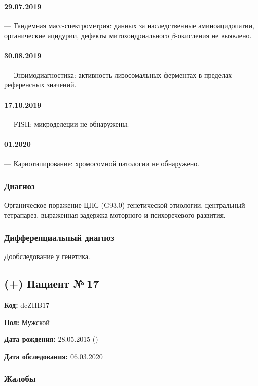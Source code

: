 \documentclass[a4paper,14pt]{extarticle}
\begin{document}
\paragraph{29.07.2019} --- Тандемная масс-спектрометрия: данных за наследственные аминоацидопатии, органические ацидурии, дефекты митохондриального $\beta$-окисления не выявлено.

\paragraph{30.08.2019} --- Энзимодиагностика: активность лизосомальных ферментах в пределах референсных значений.

\paragraph{17.10.2019} --- FISH: микроделеции не обнаружены.

\paragraph{01.2020} --- Кариотипирование: хромосомной патологии не обнаружено.

\subsubsection*{Диагноз}

Органическое поражение ЦНС (G93.0) генетической этиологии, центральный тетрапарез, выраженная задержка моторного и психоречевого развития.

\subsubsection*{Дифференциальный диагноз}

Дообследование у генетика.

\newpage
\subsection*{(+) Пациент №\,17}

\textbf{Код:} dcZHB17 

\textbf{Пол:} Мужской

\textbf{Дата рождения:} 28.05.2015 ()

\textbf{Дата обследования:} 06.03.2020

\subsubsection*{Жалобы}
\end{document}
